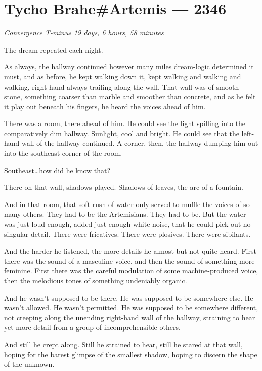 \hypertarget{tycho-braheartemis-2346}{%
\chapter{Tycho Brahe\#Artemis — 2346}}

\begin{center}
\emph{Convergence T-minus 19 days, 6 hours, 58 minutes}
\end{center}

\noindent The dream repeated each night.

As always, the hallway continued however many miles dream-logic determined it must, and as before, he kept walking down it, kept walking and walking and walking, right hand always trailing along the wall. That wall was of smooth stone, something coarser than marble and smoother than concrete, and as he felt it play out beneath his fingers, he heard the voices ahead of him.

There was a room, there ahead of him. He could see the light spilling into the comparatively dim hallway. Sunlight, cool and bright. He could see that the left-hand wall of the hallway continued. A corner, then, the hallway dumping him out into the southeast corner of the room.

Southeast\ldots how did he know that?

There on that wall, shadows played. Shadows of leaves, the arc of a fountain.

And in that room, that soft rush of water only served to muffle the voices of so many others. They had to be the Artemisians. They had to be. But the water was just loud enough, added just enough white noise, that he could pick out no singular detail. There were fricatives. There were plosives. There were sibilants.

And the harder he listened, the more details he almost-but-not-quite heard. First there was the sound of a masculine voice, and then the sound of something more feminine. First there was the careful modulation of some machine-produced voice, then the melodious tones of something undeniably organic.

And he wasn't supposed to be there. He was supposed to be somewhere else. He wasn't allowed. He wasn't permitted. He was supposed to be somewhere different, not creeping along the unending right-hand wall of the hallway, straining to hear yet more detail from a group of incomprehensible others.

And still he crept along. Still he strained to hear, still he stared at that wall, hoping for the barest glimpse of the smallest shadow, hoping to discern the shape of the unknown.

